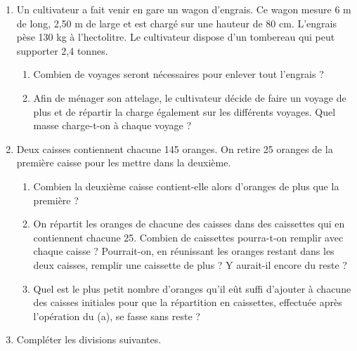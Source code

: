 \begin{enumerate}
\begin{enumerate}
 \end{enumerate}
 \item Un cultivateur a fait venir en gare un wagon 
 d'engrais. Ce wagon mesure 6 m de long, 2,50 m de large et est chargé sur une hauteur de 80 cm. 
 L'engrais pèse 130 kg à l'hectolitre. Le cultivateur dispose d'un tombereau qui peut supporter 2,4 tonnes. 
 \begin{enumerate}
 \item Combien de voyages seront nécessaires pour enlever
 tout l'engrais ?
 \item  Afin de ménager son attelage, le cultivateur décide de faire un voyage de plus et de répartir la charge également sur les différents voyages. Quel masse charge-t-on à chaque voyage ? 
 \end{enumerate}
 \item Deux caisses contiennent chacune 145 oranges. On retire 25 oranges de la première caisse pour les mettre dans la deuxième. 
 \begin{enumerate}
 \item Combien la deuxième caisse contient-elle alors d'oranges de plus que la première ? 
 \item On répartit les oranges de chacune des caisses 
 dans des caissettes qui en contiennent chacune 25. 
 Combien de caissettes pourra-t-on remplir avec chaque
 caisse ? Pourrait-on, en réunissant les oranges restant dans les deux caisses, remplir une caissette
 de plus ? Y aurait-il encore du reste ? 
 \item Quel est le plus petit nombre d'oranges qu'il eût suffi d'ajouter à chacune des caisses initiales pour que la répartition en caissettes, effectuée après l'opération du (a), se fasse sans reste ? 
 \end{enumerate}
 \item Compléter les divisions suivantes. 
 
 \end{enumerate}